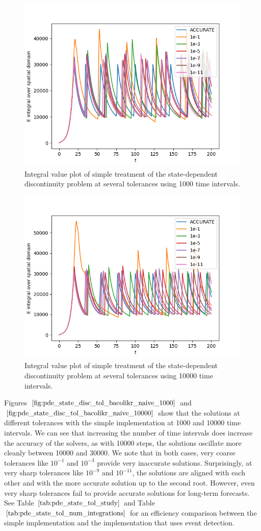 \begin{figure}[H]
\centering
\includegraphics[width=0.7\linewidth]{./figures/pde_state_disc_tol_bacolikr_naive_1000}
\caption{Integral value plot of simple treatment of the state-dependent discontinuity problem at several tolerances using 1000 time intervals.}
\label{fig:pde_state_disc_tol_bacolikr_naive_1000}
\end{figure}

\begin{figure}[H]
\centering
\includegraphics[width=0.7\linewidth]{./figures/pde_state_disc_tol_bacolikr_naive_10000}
\caption{Integral value plot of simple treatment of the state-dependent discontinuity problem at several tolerances using 10000 time intervals.}
\label{fig:pde_state_disc_tol_bacolikr_naive_10000}
\end{figure}

Figures $\ref{fig:pde_state_disc_tol_bacolikr_naive_1000}$ and $\ref{fig:pde_state_disc_tol_bacolikr_naive_10000}$ show that the solutions at different tolerances with the simple implementation at 1000 and 10000 time intervals. We can see that increasing the number of time intervals does increase the accuracy of the solvers, as with 10000 steps, the solutions oscillate more cleanly between 10000 and 30000. We note that in both cases, very coarse tolerances like $10^{-1}$ and $10^{-3}$ provide very inaccurate solutions. Surprisingly, at very sharp tolerances like $10^{-9}$ and $10^{-11}$, the solutions are aligned with each other and with the more accurate solution up to the second root. However, even very sharp tolerances fail to provide accurate solutions for long-term forecasts. See Table $\ref{tab:pde_state_tol_study}$ and Table $\ref{tab:pde_state_tol_num_integrations}$ for an efficiency comparison between the simple implementation and the implementation that uses event detection. 

